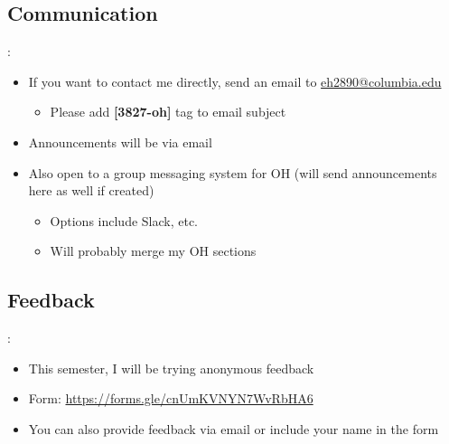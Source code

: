 \documentclass{../slides}
\begin{document}
\subsection{Communication}
\begin{frame}{\secname: \subsecname}
    \begin{itemize}
        \item If you want to contact me directly, send an email to \href{mailto:eh2890@columbia.edu}{eh2890@columbia.edu}
        \begin{itemize}
            \item Please add \textbf{[3827-oh]} tag to email subject
        \end{itemize}
        \item Announcements will be via email
        \item Also open to a group messaging system for OH (will send announcements here as well if created)
        \begin{itemize}
            \item Options include Slack, etc.
            \item Will probably merge my OH sections
        \end{itemize}
    \end{itemize}
\end{frame}

\subsection{Feedback}
\begin{frame}{\secname: \subsecname}
    \begin{itemize}
        \item This semester, I will be trying anonymous feedback
        \item Form: \url{https://forms.gle/cnUmKVNYN7WvRbHA6}
        \item You can also provide feedback via email or include your name in the form
    \end{itemize}
\end{frame}
\end{document}
